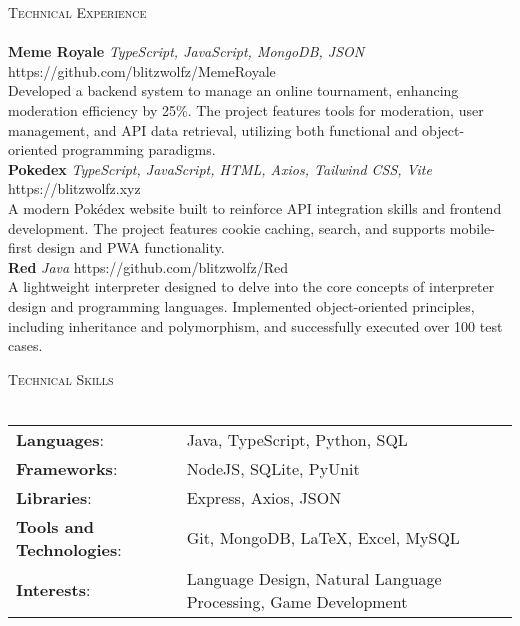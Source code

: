 \documentclass[a4paper]{article}
\newcommand{\lineunder} {
    \vspace*{-8pt} \\
    \hspace*{-18pt} \hrulefill \\
}
\newcommand{\header} [1] {
    {\hspace*{-18pt}\vspace*{6pt} \textsc{#1}}
    \vspace*{-6pt} \lineunder
}
\begin{document}
\header{Technical Experience}
{\textbf{Meme Royale}} {\sl TypeScript, JavaScript, MongoDB, JSON} \hfill https://github.com/blitzwolfz/MemeRoyale\\
Developed a backend system to manage an online tournament, enhancing moderation efficiency by 25\%. The project features tools for moderation, user management, and API data retrieval, utilizing both functional and object-oriented programming paradigms.\\
\vspace*{3mm}
{\textbf{Pokedex}} {\sl TypeScript, JavaScript, HTML, Axios, Tailwind CSS, Vite} \hfill https://blitzwolfz.xyz\\
A modern Pokédex website built to reinforce API integration skills and frontend development. The project features cookie caching, search, and supports mobile-first design and PWA functionality.\\
\vspace*{4mm}
{\textbf{Red}} {\sl Java} \hfill https://github.com/blitzwolfz/Red\\
A lightweight interpreter designed to delve into the core concepts of interpreter design and programming languages. Implemented object-oriented principles, including inheritance and polymorphism, and successfully executed over 100 test cases.\\
\vspace*{4mm}


\header{Technical Skills}
\begin{tabular}{ l l }
    \textbf{Languages}:              & Java, TypeScript, Python, SQL                                        \\
    \textbf{Frameworks}:             & NodeJS, SQLite, PyUnit                                                         \\
    \textbf{Libraries}:              & Express, Axios, JSON                                     \\
    \textbf{Tools and Technologies}: & Git, MongoDB, LaTeX, Excel, MySQL                     \\
    \textbf{Interests}:              & Language Design, Natural Language Processing, Game Development \\
\end{tabular}
\vspace{4mm}
\end{document}
